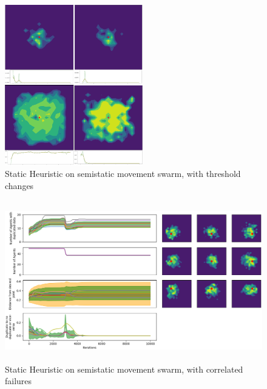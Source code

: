 \documentclass{UoYCSproject}
\begin{document}
\begin{figure}[htb]
\label{fig:Threshold_Changes}
\begin{center}
\centering
\includegraphics[height=7cm]{"./Static_Heuristic/Threshold_Changes.png"}
\caption{Static Heuristic on semi\-static movement swarm, with threshold changes}
\end{center}
\end{figure}

\begin{figure}[htb]
\label{fig:static_movement_con}
\begin{center}
\centering
\includegraphics[height=7cm]{"./Static_Heuristic/static_movement_con.png"}
\caption{Static Heuristic on semi\-static movement swarm, with correlated failures}
\end{center}
\end{figure}
\end{document}

